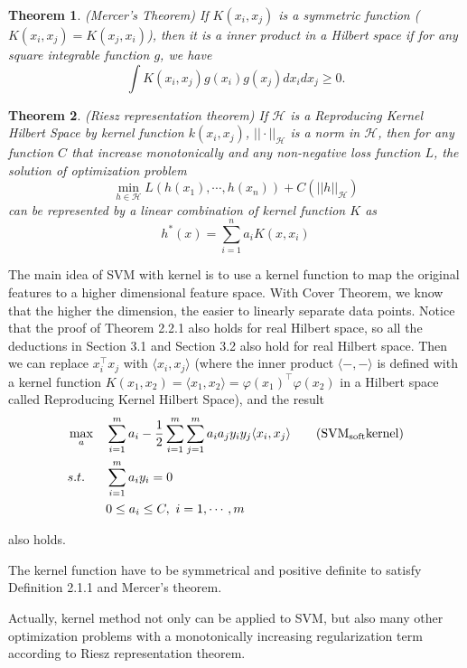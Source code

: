 \documentclass[a4paper]{report}
\newtheorem{theorem}{Theorem}[section]
\begin{document}
\begin{theorem}
    (Mercer's Theorem\cite{mercer1909functions}) If $K(x_i,x_j)$ is a symmetric function ($K(x_i,x_j)=K(x_j,x_i)$), then it is a inner product in a Hilbert space if for any square integrable function $g$, we have
    \[
        \int K(x_i,x_j)g(x_i)g(x_j)dx_idx_j \geq 0.
    \]
\end{theorem}

\begin{theorem}
    (Riesz representation theorem\cite{riesz1907espèce}) If $\mathcal H$ is a Reproducing Kernel Hilbert Space by kernel function $k(x_i,x_j)$, $||\cdot||_{\mathcal H}$ is a norm in $\mathcal H$, then for any function $C$ that increase monotonically and any non-negative loss function $L$, the solution of optimization problem
    \[
        \min_{h\in\mathcal H} L(h(x_1),\cdots,h(x_n))+C(||h||_{\mathcal H})
    \]
    can be represented by a linear combination of kernel function $K$ as
    \[
        h^*(x)=\sum_{i=1}^n a_i K(x,x_i)
    \]
\end{theorem}


The main idea of SVM with kernel is to use a kernel function to map the original features to a higher dimensional feature space. With Cover Theorem, we know that the higher the dimension, the easier to linearly separate data points. Notice that the proof of Theorem 2.2.1 also holds for real Hilbert space, so all the deductions in Section 3.1 and Section 3.2 also hold for real Hilbert space. Then we can replace $x_i^\top x_j$ with $\langle x_i,x_j \rangle$ (where the inner product $\langle -,-
    \rangle$ is defined with a kernel function $K(x_1,x_2)=\langle x_1,x_2\rangle=\varphi(x_1)^\top \varphi(x_2)$ in a Hilbert space called Reproducing Kernel Hilbert Space), and the result 
\begin{align*}
    &\max_a & & \sum_{i=1}^m a_i - \frac{1}{2} \sum_{i=1}^m\sum_{j=1}^m a_i a_j y_i y_j \langle x_i, x_j\rangle \label{softsvmk}\tag{$\mathrm{SVM_{soft} kernel}$}\\
    &s.t. \ & & \sum_{i=1}^m a_i y_i=0 \\
    & & & 0\leq a_i \leq C,\ i=1,\cdots,m 
\end{align*}

also holds. 

The kernel function have to be symmetrical and positive definite to satisfy Definition 2.1.1 and Mercer's theorem.

Actually, kernel method not only can be applied to SVM, but also many other optimization problems with a monotonically increasing regularization term according to Riesz representation theorem.
\end{document}
